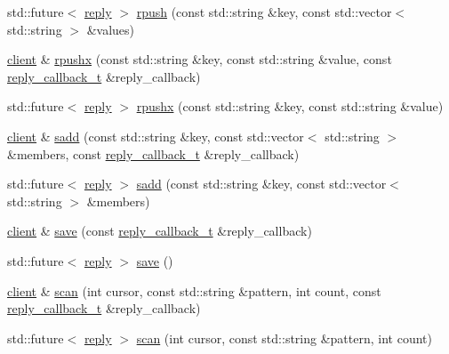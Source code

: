 \begin{DoxyCompactItemize}
\item 
std\+::future$<$ \hyperlink{classcpp__redis_1_1reply}{reply} $>$ \hyperlink{classcpp__redis_1_1client_a1e135e9e69a92a0b54059d5f81f9ff25}{rpush} (const std\+::string \&key, const std\+::vector$<$ std\+::string $>$ \&values)
\item 
\hyperlink{classcpp__redis_1_1client}{client} \& \hyperlink{classcpp__redis_1_1client_a051fdb76cf3d40bd7c0ea0dcb0eed36e}{rpushx} (const std\+::string \&key, const std\+::string \&value, const \hyperlink{classcpp__redis_1_1client_a061a1140d36d2eaeda82b09a0bb3f9f2}{reply\+\_\+callback\+\_\+t} \&reply\+\_\+callback)
\item 
std\+::future$<$ \hyperlink{classcpp__redis_1_1reply}{reply} $>$ \hyperlink{classcpp__redis_1_1client_a83d512f8f44f896383d050920634489f}{rpushx} (const std\+::string \&key, const std\+::string \&value)
\item 
\hyperlink{classcpp__redis_1_1client}{client} \& \hyperlink{classcpp__redis_1_1client_acf725ad7bc758599617ff166280f9622}{sadd} (const std\+::string \&key, const std\+::vector$<$ std\+::string $>$ \&members, const \hyperlink{classcpp__redis_1_1client_a061a1140d36d2eaeda82b09a0bb3f9f2}{reply\+\_\+callback\+\_\+t} \&reply\+\_\+callback)
\item 
std\+::future$<$ \hyperlink{classcpp__redis_1_1reply}{reply} $>$ \hyperlink{classcpp__redis_1_1client_a1a611fd2c5847d37973fed5d24f25fa1}{sadd} (const std\+::string \&key, const std\+::vector$<$ std\+::string $>$ \&members)
\item 
\hyperlink{classcpp__redis_1_1client}{client} \& \hyperlink{classcpp__redis_1_1client_a01987f9fb419cfbce81872be8cd17619}{save} (const \hyperlink{classcpp__redis_1_1client_a061a1140d36d2eaeda82b09a0bb3f9f2}{reply\+\_\+callback\+\_\+t} \&reply\+\_\+callback)
\item 
std\+::future$<$ \hyperlink{classcpp__redis_1_1reply}{reply} $>$ \hyperlink{classcpp__redis_1_1client_a40f28e53d89e46aff3df4670736b1034}{save} ()
\item 
\hyperlink{classcpp__redis_1_1client}{client} \& \hyperlink{classcpp__redis_1_1client_a3c4a8cc50f4e2152c7c79e876bf73294}{scan} (int cursor, const std\+::string \&pattern, int count, const \hyperlink{classcpp__redis_1_1client_a061a1140d36d2eaeda82b09a0bb3f9f2}{reply\+\_\+callback\+\_\+t} \&reply\+\_\+callback)
\item 
std\+::future$<$ \hyperlink{classcpp__redis_1_1reply}{reply} $>$ \hyperlink{classcpp__redis_1_1client_a847910b59d8c89acf37190f1b7e384ec}{scan} (int cursor, const std\+::string \&pattern, int count)

\end{DoxyCompactItemize}
